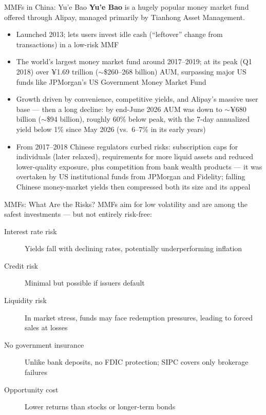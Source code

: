 \documentclass[aspectratio=169]{beamer}
\begin{document}
\begin{frame}{MMFs in China: Yu'e Bao}
\textbf{Yu'e Bao} is a hugely popular money market fund offered through Alipay, managed primarily by Tianhong Asset Management.
\begin{itemize}\small
  \item Launched 2013; lets users invest idle cash (``leftover'' change from transactions) in a low-risk MMF
  \item The world's largest money market fund around 2017--2019; at its peak (Q1 2018) over ¥1.69 trillion ($\sim$\$260--268 billion) AUM, surpassing major US funds like JPMorgan's US Government Money Market Fund
  \item Growth driven by convenience, competitive yields, and Alipay's massive user base --- then a long decline: by end-June 2026 AUM was down to $\sim$¥680 billion ($\sim$\$94 billion), roughly 60\% below peak, with the 7-day annualized yield below 1\% since May 2026 (vs.\ 6--7\% in its early years)
  \item From 2017--2018 Chinese regulators curbed risks: subscription caps for individuals (later relaxed), requirements for more liquid assets and reduced lower-quality exposure, plus competition from bank wealth products --- it was overtaken by US institutional funds from JPMorgan and Fidelity; falling Chinese money-market yields then compressed both its size and its appeal
\end{itemize}
\end{frame}

\begin{frame}{MMFs: What Are the Risks?}
MMFs aim for low volatility and are among the safest investments --- but not entirely risk-free:
\begin{description}
  \item[Interest rate risk] Yields fall with declining rates, potentially underperforming inflation
  \item[Credit risk] Minimal but possible if issuers default
  \item[Liquidity risk] In market stress, funds may face redemption pressures, leading to forced sales at losses
  \item[No government insurance] Unlike bank deposits, no FDIC protection; SIPC covers only brokerage failures
  \item[Opportunity cost] Lower returns than stocks or longer-term bonds
\end{description}
\end{frame}
\end{document}
